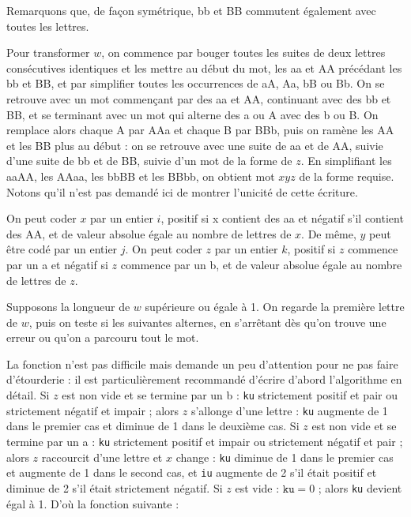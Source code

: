 Remarquons que, de façon symétrique, bb et BB commutent également avec toutes les lettres.

\Q
Pour transformer $w$, on commence par bouger toutes les suites de deux lettres consécutives identiques et les mettre au début du mot, les aa et AA précédant les bb et BB, et par simplifier toutes les occurrences de aA, Aa, bB ou Bb. On se retrouve avec un mot commençant par des aa et AA, continuant avec des bb et BB, et se terminant avec un mot qui alterne des a ou A avec des b ou B. On remplace alors chaque A par AAa et chaque B par BBb, puis on ramène les AA et les BB plus au début : on se retrouve avec une suite de aa et de AA, suivie d'une suite de bb et de BB, suivie d'un mot de la forme de $z$. En simplifiant les aaAA, les AAaa, les bbBB et les BBbb, on obtient mot $xyz$ de la forme requise. Notons qu'il n'est pas demandé ici de montrer l'unicité de cette écriture.

\Q
On peut coder $x$ par un entier $i$, positif si x contient des aa et négatif s'il contient des AA, et de valeur absolue égale au nombre de lettres de $x$. De même, $y$ peut être codé par un entier $j$. On peut coder $z$ par un entier $k$, positif si $z$ commence par un a et négatif si $z$ commence par un b, et de valeur absolue égale au nombre de lettres de $z$.

\Q
Supposons la longueur de $w$ supérieure ou égale à 1. On regarde la première lettre de $w$, puis on teste si les suivantes alternes, en s'arrêtant dès qu'on trouve une erreur ou qu'on a parcouru tout le mot.


\newpage

\Q
La fonction n'est pas difficile mais demande un peu d'attention pour ne pas faire d'étourderie : il est particulièrement recommandé d'écrire d'abord l'algorithme en détail. Si $z$ est non vide et se termine par un b : \texttt{ku} strictement positif et pair ou strictement négatif et impair ; alors $z$ s'allonge d'une lettre : \texttt{ku} augmente de 1 dans le premier cas et diminue de 1 dans le deuxième cas. Si $z$ est non vide et se termine par un a : \texttt{ku} strictement positif et impair ou strictement négatif et pair ; alors $z$ raccourcit d'une lettre et $x$ change : \texttt{ku} diminue de 1 dans le premier cas et augmente de 1 dans le second cas, et \texttt{iu} augmente de 2 s'il était positif et diminue de 2 s'il était strictement négatif. Si $z$ est vide : $\texttt{ku}=0$ ; alors \texttt{ku} devient égal à 1. D'où la fonction suivante :

